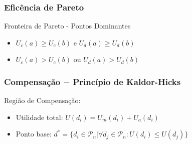 \documentclass[14pt]{beamer}
\begin{document}
\begin{frame}\frametitle{Eficência de Pareto}

Fronteira de Pareto - Pontos Dominantes

\begin{itemize}
\item $U_c(a)\ge U_c(b)$ e $U_d(a)\ge U_d(b)$
\item $U_c(a) > U_c(b)$ ou $U_d(a) > U_d(b)$
\end{itemize}



\end{frame}

\begin{frame}\frametitle{Compensação $-$ Princípio de Kaldor-Hicks}

Região de Compensação:

\begin{itemize}
\item Utilidade total: $U(d_i)=U_m(d_i)+U_a(d_i)$
\item Ponto base: $d^*=\{d_i\in\mathcal{P}_n | \forall d_j\in\mathcal{P}_n: U(d_i)\leq U(d_j)\}$
\end{itemize}



\end{frame}
\end{document}
